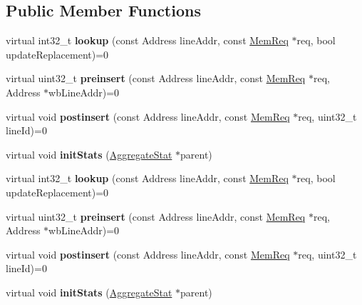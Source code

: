 \subsection*{Public Member Functions}
\begin{DoxyCompactItemize}
\item 
\hypertarget{classCacheArray_a2c638cb1d7a7899dd00a22b07327f598}{virtual int32\-\_\-t {\bfseries lookup} (const Address line\-Addr, const \hyperlink{structMemReq}{Mem\-Req} $\ast$req, bool update\-Replacement)=0}\label{classCacheArray_a2c638cb1d7a7899dd00a22b07327f598}

\item 
\hypertarget{classCacheArray_acf1528a7fbf12c7cc339353372ab8f2e}{virtual uint32\-\_\-t {\bfseries preinsert} (const Address line\-Addr, const \hyperlink{structMemReq}{Mem\-Req} $\ast$req, Address $\ast$wb\-Line\-Addr)=0}\label{classCacheArray_acf1528a7fbf12c7cc339353372ab8f2e}

\item 
\hypertarget{classCacheArray_ace44aa583ab1e84f9fe778d8b6ad8ce2}{virtual void {\bfseries postinsert} (const Address line\-Addr, const \hyperlink{structMemReq}{Mem\-Req} $\ast$req, uint32\-\_\-t line\-Id)=0}\label{classCacheArray_ace44aa583ab1e84f9fe778d8b6ad8ce2}

\item 
\hypertarget{classCacheArray_aca28881799337dc402d29d491e24efdb}{virtual void {\bfseries init\-Stats} (\hyperlink{classAggregateStat}{Aggregate\-Stat} $\ast$parent)}\label{classCacheArray_aca28881799337dc402d29d491e24efdb}

\item 
\hypertarget{classCacheArray_a2c638cb1d7a7899dd00a22b07327f598}{virtual int32\-\_\-t {\bfseries lookup} (const Address line\-Addr, const \hyperlink{structMemReq}{Mem\-Req} $\ast$req, bool update\-Replacement)=0}\label{classCacheArray_a2c638cb1d7a7899dd00a22b07327f598}

\item 
\hypertarget{classCacheArray_acf1528a7fbf12c7cc339353372ab8f2e}{virtual uint32\-\_\-t {\bfseries preinsert} (const Address line\-Addr, const \hyperlink{structMemReq}{Mem\-Req} $\ast$req, Address $\ast$wb\-Line\-Addr)=0}\label{classCacheArray_acf1528a7fbf12c7cc339353372ab8f2e}

\item 
\hypertarget{classCacheArray_ace44aa583ab1e84f9fe778d8b6ad8ce2}{virtual void {\bfseries postinsert} (const Address line\-Addr, const \hyperlink{structMemReq}{Mem\-Req} $\ast$req, uint32\-\_\-t line\-Id)=0}\label{classCacheArray_ace44aa583ab1e84f9fe778d8b6ad8ce2}

\item 
\hypertarget{classCacheArray_aca28881799337dc402d29d491e24efdb}{virtual void {\bfseries init\-Stats} (\hyperlink{classAggregateStat}{Aggregate\-Stat} $\ast$parent)}\label{classCacheArray_aca28881799337dc402d29d491e24efdb}

\end{DoxyCompactItemize}


